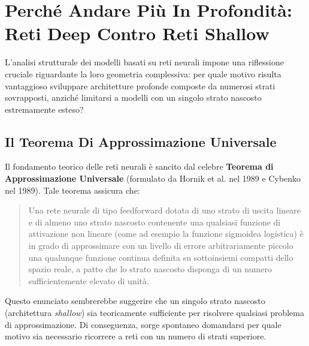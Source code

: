 ﻿\documentclass[11pt, a4paper]{article}
\begin{document}
\newpage

\section{Perché Andare Più In Profondità: Reti Deep Contro Reti Shallow}

L'analisi strutturale dei modelli basati su reti neurali impone una riflessione cruciale riguardante la loro geometria complessiva: per quale motivo risulta vantaggioso sviluppare architetture profonde composte da numerosi strati sovrapposti, anziché limitarsi a modelli con un singolo strato nascosto estremamente esteso?

\subsection{Il Teorema Di Approssimazione Universale}

Il fondamento teorico delle reti neurali è sancito dal celebre \textbf{Teorema di Approssimazione Universale} (formulato da Hornik et al. nel 1989 e Cybenko nel 1989). Tale teorema assicura che:
\begin{quote}
Una rete neurale di tipo feedforward dotata di uno strato di uscita lineare e di almeno uno strato nascosto contenente una qualsiasi funzione di attivazione non lineare (come ad esempio la funzione sigmoidea logistica) è in grado di approssimare con un livello di errore arbitrariamente piccolo una qualunque funzione continua definita su sottoinsiemi compatti dello spazio reale, a patto che lo strato nascosto disponga di un numero sufficientemente elevato di unità.
\end{quote}

Questo enunciato sembrerebbe suggerire che un singolo strato nascosto (architettura \emph{shallow}) sia teoricamente sufficiente per risolvere qualsiasi problema di approssimazione. Di conseguenza, sorge spontaneo domandarsi per quale motivo sia necessario ricorrere a reti con un numero di strati superiore.
\end{document}
